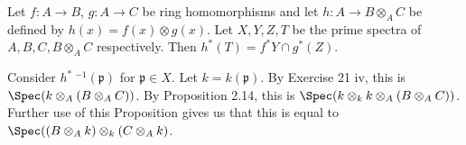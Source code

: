 \documentclass[a4paper]{exam}
\newif\ifhint
\begin{document}
\begin{questions}
\begin{solution}
\end{solution}

\question Let $f:A\to B $, $g:A\to C $ be ring homomorphisms and let $h: A \to B \otimes _A C $ be defined by $h(x) = f(x) \otimes g(x) $. Let $X,Y,Z,T $ be the prime spectra of $A,B,C,B \otimes _A C $ respectively. Then $h^\ast(T) = f^\ast Y \cap g^\ast(Z) $.
\ifhint
	Let $\mathfrak{p} \in X $, and let $k = k(\mathfrak{p}) $ be the residue field at $\mathfrak{p} $.
	By Exercise 21, the fiber $h^\ast\ ^{-1}(\mathfrak{p}) $ is the spectrum of $(B \otimes _A C) \otimes _A k \cong (B \otimes _A k) \otimes _k (C \otimes _A k) $.
	Hence $\mathfrak{p} \in h^\ast(T) \iff (B \otimes _A k) \otimes _k (C \otimes _A k) \ne 0 \iff B \otimes _A k \ne 0 $ and $C \otimes _A k \ne 0 \iff \mathfrak{p}\in f^\ast(Y) \cap g^\ast(Z)$.
\fi
\begin{solution}
	Consider $h^\ast\ ^{-1}(\mathfrak{p}) $ for $\mathfrak{p} \in X $.
	Let $k = k(\mathfrak{p}) $.
	By Exercise 21 iv, this is $\Spec(k \otimes _A (B \otimes _A C))$.
	By Proposition 2.14, this is $\Spec(k \otimes _k k \otimes _A (B \otimes _A C))$.
	Further use of this Proposition gives us that this is equal to $\Spec((B \otimes _A k) \otimes _k (C \otimes _A k)$.


\end{solution}
\end{questions}
\end{document}
